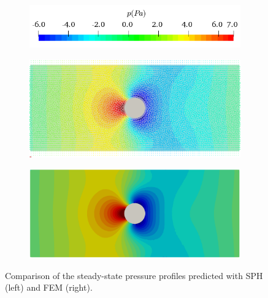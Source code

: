 \documentclass[final,3p,times]{elsarticle}
\begin{document}
\begin{figure}[H]
	\centering
		\begin{subfigure}{0.45\columnwidth}	
		\centering
		\includegraphics[width=1.0\textwidth]{Images/FOC_p.png}
	\end{subfigure}
	
	\begin{subfigure}{0.47\columnwidth}	
		\centering
		\includegraphics[width=1.0\textwidth]{Images/FOC_SPH_p.png}
	\end{subfigure}
	\begin{subfigure}{0.47\columnwidth}
		\centering
		\includegraphics[width=1.0\textwidth]{Images/FOC_FEM_p.png}
	\end{subfigure}
	\caption{Comparison of the steady-state pressure profiles predicted with  SPH (left) and FEM (right). }	\label{fig:FoCP}
\end{figure} 
\end{document}
